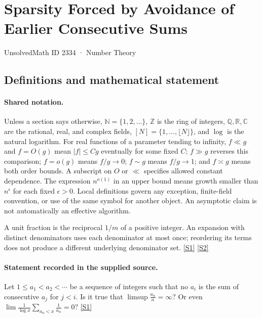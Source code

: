 \documentclass[11pt,a4paper]{article}
\newcommand{\N}{\mathbb{N}}
\newcommand{\Z}{\mathbb{Z}}
\newcommand{\Q}{\mathbb{Q}}
\newcommand{\R}{\mathbb{R}}
\newcommand{\C}{\mathbb{C}}
\newcommand{\sref}[2]{\hyperlink{source:#1:#2}{[S#2]}}
\begin{document}

\setcounter{section}{2333}

\section{Sparsity Forced by Avoidance of Earlier Consecutive Sums}\label{2334}

{\small\sffamily UnsolvedMath ID 2334 · Number Theory}

\subsection{Definitions and mathematical statement}

\paragraph{Shared notation.}Unless a section says otherwise, $\N=\{1,2,\ldots\}$,
$\Z$ is the ring of integers, $\Q,\R,\C$ are the rational, real, and complex
fields, $[N]=\{1,\ldots,\lfloor N\rfloor\}$, and $\log$ is the natural
logarithm. For real functions of a parameter tending to infinity,
$f\ll g$ and $f=O(g)$ mean $|f|\leq Cg$ eventually for some fixed $C$;
$f\gg g$ reverses this comparison; $f=o(g)$ means $f/g\to0$;
$f\sim g$ means $f/g\to1$; and $f\asymp g$ means both order bounds.
A subscript on $O$ or $\ll$ specifies allowed constant dependence.
The expression $n^{o(1)}$ in an upper bound means growth smaller than
$n^\epsilon$ for each fixed $\epsilon>0$. Local definitions govern any
exception, finite-field convention, or use of the same symbol for another
object. An asymptotic claim is not automatically an effective algorithm.



A unit fraction is the reciprocal $1/m$ of a positive integer. An expansion with distinct denominators uses each denominator at most once; reordering its terms does not produce a different underlying denominator set. \sref{2334}{1} \sref{2334}{2}

\paragraph{Statement recorded in the supplied source.}
Let $1\leq a_1<a_2<\cdots$ be a sequence of integers such that no $a_i$ is the sum of consecutive $a_j$ for $j<i$. Is it true that $ \limsup \frac{a_n}{n}=\infty? $ Or even $ \lim \frac{1}{\log x}\sum_{a_n<x}\frac{1}{a_n}=0? $ \sref{2334}{1}
\end{document}
